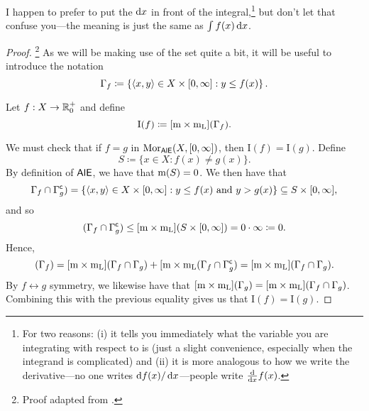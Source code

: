 \begin{thm}[Integral]
\begin{rmk}
\end{rmk}
\begin{rmk}
I happen to prefer to put the $\mathop{}\!\mathrm{d} x$ in front of the integral,\footnote{For two reasons:  (i) it tells you immediately what the variable you are integrating with respect to is (just a slight convenience, especially when the integrand is complicated) and (ii) it is more analogous to how we write the derivative---no one writes $\mathop{}\!\mathrm{d} f(x)/\mathop{}\!\mathrm{d} x$---people write $\frac{\mathop{}\!\mathrm{d}}{\mathop{}\!\mathrm{d} x}f(x)$.} but don't let that confuse you---the meaning is just the same as $\int f(x)\mathop{}\!\mathrm{d} x$.
\end{rmk}
\begin{proof}\footnote{Proof adapted from \cite[pg.~377]{Pugh}.}
As we will be making use of the set quite a bit, it will be useful to introduce the notation
\begin{equation}
\Gamma _f\coloneqq \left\{ \langle x,y\rangle\in X\times [0,\infty ]:y\leq f(x)\right\} .
\end{equation}

Let $f:X\rightarrow \mathbb{R} _0^+$ and define
\begin{equation}
\mathrm{I}(f)\coloneqq [\mathrm{m} \times \mathrm{m} _{\mathrm{L}}](\Gamma _f) .
\end{equation}

We must check that if $f=g$ in $\operatorname{Mor} _{\mathsf{AlE}}(X,[0,\infty ])$, then $\mathrm{I}(f)=\mathrm{I}(g)$.  Define
\begin{equation}
S\coloneqq \{ x\in X:f(x)\neq g(x)\} .
\end{equation}
By definition of $\mathsf{AlE}$, we have that $\mathrm{m} (S)=0$.  We then have that
\begin{equation}
\Gamma _f\cap \Gamma _g^{\mathsf{c}})=\{ \langle x,y\rangle\in X\times [0,\infty ]:y\leq f(x)\text{ and }y>g(x)\} \subseteq S\times [0,\infty ],
\end{equation}
and so
\begin{equation}
[\meas \times \meas _{\mathrm{L}}](\Gamma _f\cap \Gamma _g^{\comp})\leq [\meas \times \meas _{\mathrm{L}}](S\times [0,\infty ])=0\cdot \infty \coloneqq 0.
\end{equation}
Hence,
\begin{equation}
[\meas \times \meas _{\mathrm{L}}](\Gamma _f)=[\meas \times \meas _{\mathrm{L}}](\Gamma _f\cap \Gamma _g)+[\meas \times \meas _{\mathrm{L}}(\Gamma _f\cap \Gamma _g^{\comp})=[\meas \times \meas _{\mathrm{L}}](\Gamma _f\cap \Gamma _g).
\end{equation}
By $f\leftrightarrow g$ symmetry, we likewise have that $[\mathrm{m} \times \mathrm{m} _{\mathrm{L}}](\Gamma _g)=[\mathrm{m} \times \mathrm{m} _{\mathrm{L}}](\Gamma _f\cap \Gamma _g)$.  Combining this with the previous equality gives us that $\mathrm{I}(f)=\mathrm{I}(g)$.


\end{proof}
\end{thm}
